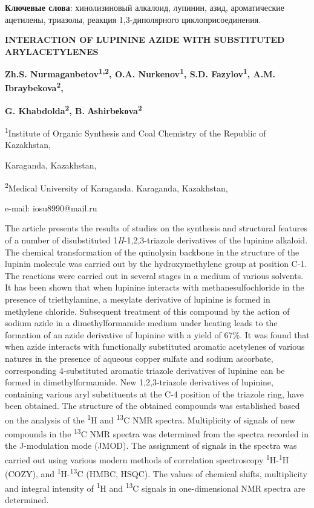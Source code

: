 {\bfseries Ключевые слова}: хинолизиновый алкалоид, лупинин, азид,
ароматические ацетилены, триазолы, реакция 1,3-диполярного
циклоприсоединения.

\begin{center}
{\large\bfseries INTERACTION OF LUPININE AZIDE WITH SUBSTITUTED ARYLACETYLENES}

{\bfseries Zh.S. Nurmaganbetov\textsuperscript{1,2}, O.A.
Nurkenov\textsuperscript{1}, S.D. Fazylov\textsuperscript{1}\envelope, A.M.
Ibraybekova\textsuperscript{2},}

{\bfseries G. Khabdolda\textsuperscript{2}, B.
Аshirbеkоva\textsuperscript{2}}

\textsuperscript{1}Institute of Organic Synthesis and Coal Chemistry of
the Republic of Kazakhstan,

Karaganda, Kazakhstan,

\textsuperscript{2}Medical University of Karaganda. Karaganda,
Kazakhstan,

e-mail: iosu8990@mail.ru
\end{center}

The article presents the results of studies on the synthesis and
structural features of a number of disubstituted
1\emph{H}-1,2,3-triazole derivatives of the lupinine alkaloid. The
chemical transformation of the quinolysin backbone in the structure of
the lupinin molecule was carried out by the hydroxymethylene group at
position C-1. The reactions were carried out in several stages in a
medium of various solvents. It has been shown that when lupinine
interacts with methanesulfochloride in the presence of triethylamine, a
mesylate derivative of lupinine is formed in methylene chloride.
Subsequent treatment of this compound by the action of sodium azide in a
dimethylformamide medium under heating leads to the formation of an
azide derivative of lupinine with a yield of 67\%. It was found that
when azide interacts with functionally substituted aromatic acetylenes
of various natures in the presence of aqueous copper sulfate and sodium
ascorbate, corresponding 4-substituted aromatic triazole derivatives of
lupinine can be formed in dimethylformamide. New 1,2,3-triazole
derivatives of lupinine, containing various aryl substituents at the C-4
position of the triazole ring, have been obtained. The structure of the
obtained compounds was established based on the analysis of the
\textsuperscript{1}H and \textsuperscript{13}C NMR spectra. Multiplicity
of signals of new compounds in the \textsuperscript{13}C NMR spectra was
determined from the spectra recorded in the J-modulation mode (JMOD).
The assignment of signals in the spectra was carried out using various
modern methods of correlation spectroscopy
\textsuperscript{1}H-\textsuperscript{1}H (COZY), and
\textsuperscript{1}H-\textsuperscript{13}C (HMBC, HSQC). The values of
chemical shifts, multiplicity and integral intensity of
\textsuperscript{1}H and \textsuperscript{13}C signals in
one-dimensional NMR spectra are determined.

